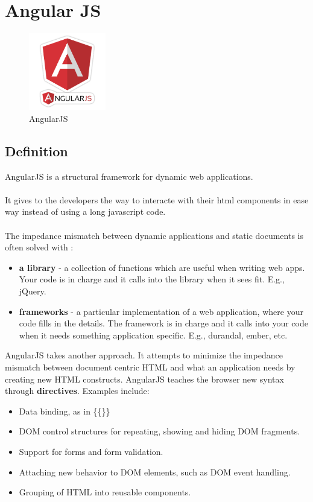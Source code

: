 	\section{Angular JS}
		\begin{figure}[h]
		\centering
		\includegraphics[width=0.3\textwidth]{AngularJS_logo.png}
		\caption{AngularJS}
	\end{figure}
		\subsection{Definition}
	AngularJS is a structural framework for dynamic web applications.
	\\
	\\
	It gives to the developers the way to interacte with their html components in ease way instead of using a long javascript code.
	\\
	\\
	The impedance mismatch between dynamic applications and static documents is often solved with \cite{ref8} :
	\begin{itemize}
		
		\item \textbf{a library} - a collection of functions which are useful when writing web apps. Your code is in charge and it calls into the library when it sees fit. E.g., \colorbox{mygray}{jQuery}.
		\item \textbf{frameworks} - a particular implementation of a web application, where your code fills in the details. The framework is in charge and it calls into your code when it needs something application specific. E.g., \colorbox{mygray}{durandal}, \colorbox{mygray}{ember}, etc.
	\end{itemize}
	AngularJS takes another approach. It attempts to minimize the impedance mismatch between document centric HTML and what an application needs by creating new HTML constructs. AngularJS teaches the browser new syntax through \textbf{directives}. Examples include:
	\begin{itemize}
		\item Data binding, as in \colorbox{mygray}{\{\{\}\}}
		\item DOM control structures for repeating, showing and hiding DOM fragments.
		\item Support for forms and form validation.
		\item Attaching new behavior to DOM elements, such as DOM event handling.
		\item Grouping of HTML into reusable components.	
	\end{itemize}
